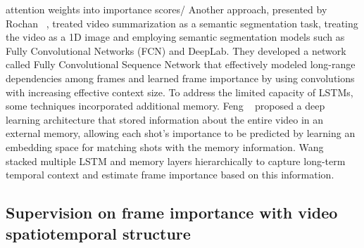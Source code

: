 attention weights into importance scores/ Another approach, presented by Rochan \etal~\cite{rochan2018sequence}, treated video summarization as a semantic segmentation task, treating the video as a 1D image and employing semantic segmentation models such as Fully Convolutional Networks (FCN) and DeepLab. They developed a network called Fully Convolutional Sequence Network that effectively modeled long-range dependencies among frames and learned frame importance by using convolutions with increasing effective context size. To address the limited capacity of LSTMs, some techniques incorporated additional memory. Feng \etal~\cite{feng2018memory} proposed a deep learning architecture that stored information about the entire video in an external memory, allowing each shot's importance to be predicted by learning an embedding space for matching shots with the memory information. Wang \etal~\cite{wang2019stacked} stacked multiple LSTM and memory layers hierarchically to capture long-term temporal context and estimate frame importance based on this information.


\subsection{Supervision on frame importance with video spatiotemporal structure}
\label{subsec:rel-sup-spatiotemporal}

